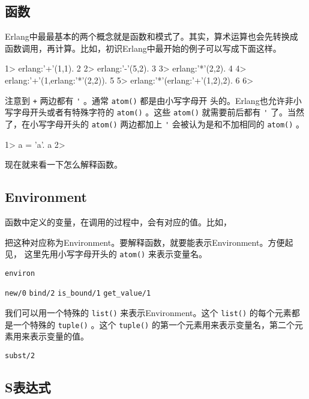 \documentclass[preview,multi,crop=false,border=1in,class=memoir]{standalone}
\begin{document}
\begin{preview-page}
\section{函数}

Erlang中最最基本的两个概念就是函数和模式了。其实，算术运算也会先转换成
函数调用，再计算。比如，初识Erlang中最开始的例子可以写成下面这样。

\begin{ErlangShellSession}
1> erlang:'+'(1,1).
2
2> erlang:'-'(5,2).
3
3> erlang:'*'(2,2).
4
4> erlang:'+'(1,erlang:'*'(2,2)).
5
5> erlang:'*'(erlang:'+'(1,2),2).
6
6>
\end{ErlangShellSession}

注意到 \verb|+| 两边都有 \verb|'| 。通常 \verb|atom()| 都是由小写字母开
头的。Erlang也允许非小写字母开头或者有特殊字符的 \verb|atom()| 。这些
\verb|atom()| 就需要前后都有 \verb|'| 了。当然了，在小写字母开头的
\verb|atom()| 两边都加上 \verb|'| 会被认为是和不加相同的 \verb|atom()| 。

\begin{ErlangShellSession}
1> a = 'a'.
a
2>
\end{ErlangShellSession}

现在就来看一下怎么解释函数。


\subsection{Environment}

函数中定义的变量，在调用的过程中，会有对应的值。比如，

把这种对应称为Environment。要解释函数，就要能表示Environment。方便起见，
这里先用小写字母开头的 \verb|atom()| 来表示变量名。

\begin{Exercise}[title={Environment},difficulty=2]
\verb|environ|

\verb|new/0|
\verb|bind/2|
\verb|is_bound/1|
\verb|get_value/1|
\end{Exercise}

\nonzeroparskip

我们可以用一个特殊的 \verb|list()| 来表示Environment。这个
\verb|list()| 的每个元素都是一个特殊的 \verb|tuple()| 。这个 \verb|tuple()|
的第一个元素用来表示变量名，第二个元素用来表示变量的值。


\verb|subst/2|


\subsection{S表达式}


\end{preview-page}
\end{document}
